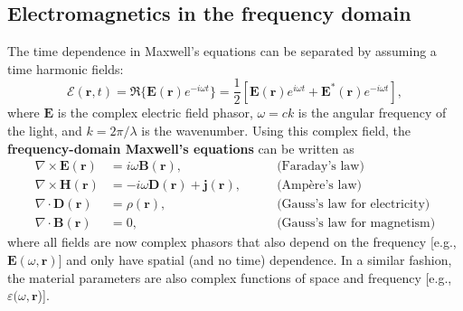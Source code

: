 \subsection*{Electromagnetics in the frequency domain}

The time dependence in Maxwell's equations can be separated by assuming a
time harmonic fields:
\begin{equation}
 \bm{\mathcal{E}}(\mathbf{r}, t) = \Re \{ \mathbf{E}(\mathbf{r}) e^{-i\omega
 t} \}= \frac{1}{2}\left[ \mathbf{E}(\mathbf{r}) e^{i\omega t} +
 \mathbf{E}^*(\mathbf{r}) e^{-i\omega t}\right],
\end{equation}
where $\mathbf{E}$ is the complex electric field phasor, $\omega=ck$ is the angular
frequency of the light, and $k=2\pi/\lambda$ is the wavenumber.
Using this complex field, the \textbf{frequency-domain Maxwell's equations} can be written as
\begin{align}
    \nabla \times \mathbf{E}(\mathbf{r}) & = i\omega \mathbf{B}(\mathbf{r}),
 \quad \quad                          & \text{(Faraday's law)} \label{eq:curlE_freq}                                   \\
    \nabla \times \mathbf{H}(\mathbf{r}) & = -i\omega \mathbf{D}(\mathbf{r}) +
 \mathbf{j}(\mathbf{r}), \quad \quad  & \text{(Ampère's law)}
    \label{eq:curlH_freq}                                                                                                 \\
    \nabla \cdot \mathbf{D}(\mathbf{r})  & = \rho(\mathbf{r}), \quad \quad
                                         & \text{(Gauss's law for electricity)} \label{eq:divD_freq}                      \\
    \nabla \cdot \mathbf{B}(\mathbf{r})  & = 0, \quad \quad                                          & \text{(Gauss's law
 for magnetism)} \label{eq:divB_freq}
\end{align}
where all fields are now complex phasors that also depend on the frequency
[e.g., $\mathbf{E}(\omega, \mathbf{r})$] and only have spatial (and no time) dependence. In a
similar fashion,
the material parameters are also complex functions of space and frequency [e.g.,
$\varepsilon(\omega, \mathbf{r}$)].

